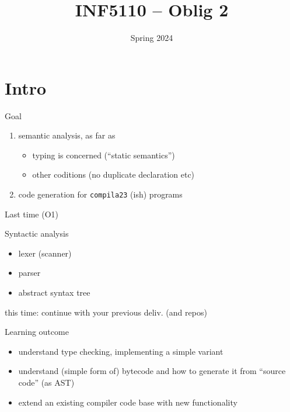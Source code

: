 \documentclass{beamer}
\date{Spring 2024}
\title{INF5110 -- Oblig 2}
\renewcommand{\maketitle}{}
\begin{document}
\maketitle
\section{Intro}
\label{sec:org3fe0ff2}
\begin{frame}[label={sec:orgfae68f3},fragile]{Goal}
 \begin{enumerate}
\item \alert{semantic  analysis}, as far as 
\begin{itemize}
\item \alert{typing} is concerned (``static semantics'')
\item other coditions (no duplicate declaration etc)
\end{itemize}

\item \alert{code generation} for \texttt{compila23} (ish) programs
\end{enumerate}
\end{frame}
\begin{frame}[label={sec:org919252c}]{Last time (O1)}
\begin{block}{Syntactic analysis}
\begin{itemize}
\item lexer (scanner)
\item parser
\item abstract syntax tree
\end{itemize}
\end{block}
\alert{this time}: continue with your previous deliv. (and repos)
\end{frame}
\begin{frame}[label={sec:orgaf8deec}]{Learning outcome}
\begin{itemize}
\item understand type checking, implementing a simple variant
\end{itemize}


\begin{itemize}
\item understand (simple form of) bytecode and how to generate it from ``source
code'' (as AST)

\item extend an existing compiler code base with new functionality
\end{itemize}
\end{frame}
\end{document}

